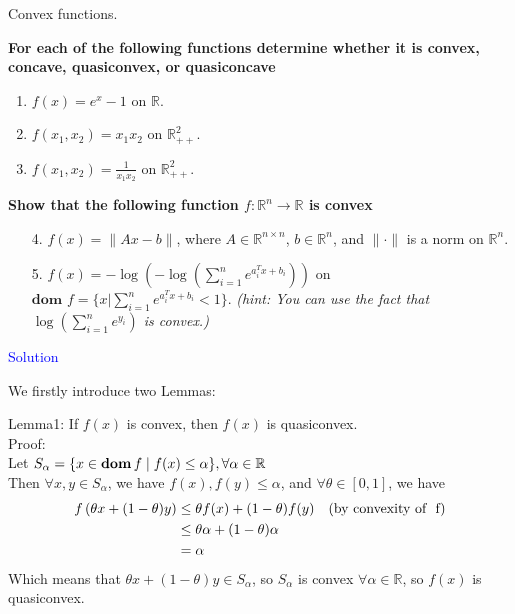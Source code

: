 Convex functions.

\textbf{ For each of the following functions determine whether it is convex, concave, quasiconvex, or quasiconcave}
\begin{enumerate}
    \item $f(x) = e^x - 1$ on $\mathbb{R}$. 
    \item $f(x_1, x_2) = x_1 x_2$ on $\mathbb{R}^2_{++}$. 
    \item $f(x_1, x_2) = \frac{1}{x_1 x_2}$ on $\mathbb{R}^2_{++}$. 
\end{enumerate}
\textbf{Show that the following function $f : \mathbb{R}^n \to \mathbb{R}$ is convex}
\begin{enumerate}
    \item[4.] $f(x) = \|A x - b\|$, where $A \in \mathbb{R}^{n \times n}$, $b \in \mathbb{R}^n$, and $\|\cdot\|$ is a norm on $\mathbb{R}^n$. 
    \item[5.] $f(x) = -\log \left( -\log \left( \sum_{i=1}^n e^{a_i^Tx + b_i} \right) \right)$ on $\textbf{dom }f = \{x|\sum_{i=1}^n e^{a_i^Tx + b_i} < 1\}$. \emph{(hint: You can use the fact that $\log \left( \sum_{i=1}^n e^{y_i} \right)$ is convex.)} 
\end{enumerate}

\textcolor{blue}{Solution}

We firstly introduce two Lemmas:

Lemma1: If $f(x)$ is convex, then $f(x)$ is quasiconvex. \\
Proof: \\
Let $S_{\alpha} = \{x\in\mathop{\bf dom} f \mid f(x) \leq \alpha\}, \forall \alpha\in\mathbb{R}$ \\
Then $\forall x,y\in S_{\alpha}$, we have $f(x), f(y)\leq \alpha$, and $\forall \theta\in[0,1]$, we have
\begin{align*}
f\left(\theta x + (1-\theta)y \right) &\leq \theta f(x) + (1-\theta)f(y) \text{\quad(\text{by convexity of } f)} \\
&\leq \theta \alpha + (1-\theta)\alpha \\
&= \alpha
\end{align*}
Which means that $\theta x + (1-\theta)y \in S_{\alpha}$, so $S_{\alpha}$ is convex $\forall \alpha\in\mathbb{R}$, so $f(x)$ is quasiconvex. \\


